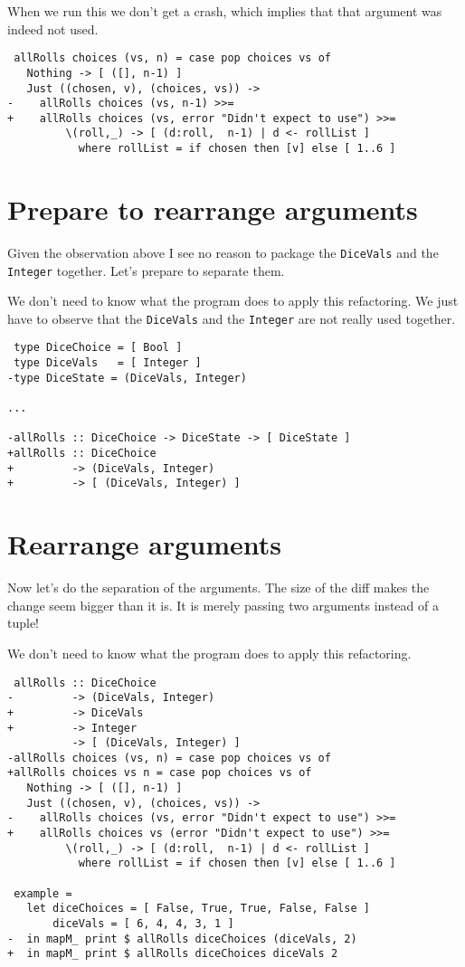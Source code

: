 When we run this we don't get a crash, which implies that that argument was indeed not used.

\begin{verbatim}
 allRolls choices (vs, n) = case pop choices vs of
   Nothing -> [ ([], n-1) ]
   Just ((chosen, v), (choices, vs)) ->
-    allRolls choices (vs, n-1) >>=
+    allRolls choices (vs, error "Didn't expect to use") >>=
         \(roll,_) -> [ (d:roll,  n-1) | d <- rollList ]
           where rollList = if chosen then [v] else [ 1..6 ]
\end{verbatim}
           
\section{Prepare to rearrange arguments}


Given the observation above I see no reason to package the \texttt{DiceVals} and the \texttt{Integer} together. Let's prepare to separate them.

We don't need to know what the program does to apply this refactoring. We just have to observe that the \texttt{DiceVals} and the \texttt{Integer} are not really used together.

\begin{verbatim}
 type DiceChoice = [ Bool ]
 type DiceVals   = [ Integer ]
-type DiceState = (DiceVals, Integer)

...

-allRolls :: DiceChoice -> DiceState -> [ DiceState ]
+allRolls :: DiceChoice
+         -> (DiceVals, Integer)
+         -> [ (DiceVals, Integer) ]
\end{verbatim}


\section{Rearrange arguments}


Now let's do the separation of the arguments. The size of the diff makes the change seem bigger than it is. It is merely passing two arguments instead of a tuple!

We don't need to know what the program does to apply this refactoring.

\begin{verbatim}
 allRolls :: DiceChoice
-         -> (DiceVals, Integer)
+         -> DiceVals
+         -> Integer
          -> [ (DiceVals, Integer) ]
-allRolls choices (vs, n) = case pop choices vs of
+allRolls choices vs n = case pop choices vs of
   Nothing -> [ ([], n-1) ]
   Just ((chosen, v), (choices, vs)) ->
-    allRolls choices (vs, error "Didn't expect to use") >>=
+    allRolls choices vs (error "Didn't expect to use") >>=
         \(roll,_) -> [ (d:roll,  n-1) | d <- rollList ]
           where rollList = if chosen then [v] else [ 1..6 ]

 example =
   let diceChoices = [ False, True, True, False, False ]
       diceVals = [ 6, 4, 4, 3, 1 ]
-  in mapM_ print $ allRolls diceChoices (diceVals, 2)
+  in mapM_ print $ allRolls diceChoices diceVals 2
\end{verbatim}

